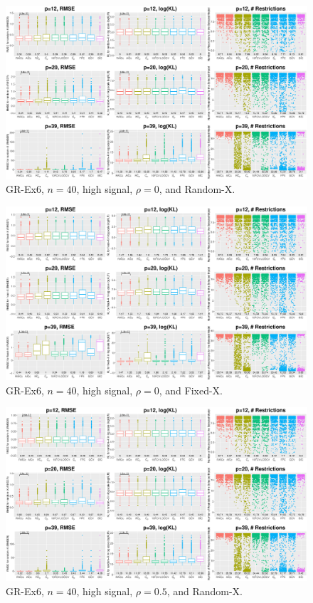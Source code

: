 \clearpage
\begin{figure}[!ht]
\centering
\includegraphics[width=\textwidth]{figures/supplement/randomx_GR-Ex6_n40_hsnr_rho0.eps}
\caption{GR-Ex6, $n=40$, high signal, $\rho=0$, and Random-X.}
\end{figure}
\begin{figure}[!ht]
\centering
\includegraphics[width=\textwidth]{figures/supplement/fixedx_GR-Ex6_n40_hsnr_rho0.eps}
\caption{GR-Ex6, $n=40$, high signal, $\rho=0$, and Fixed-X.}
\end{figure}
\clearpage
\begin{figure}[!ht]
\centering
\includegraphics[width=\textwidth]{figures/supplement/randomx_GR-Ex6_n40_hsnr_rho05.eps}
\caption{GR-Ex6, $n=40$, high signal, $\rho=0.5$, and Random-X.}
\end{figure}
